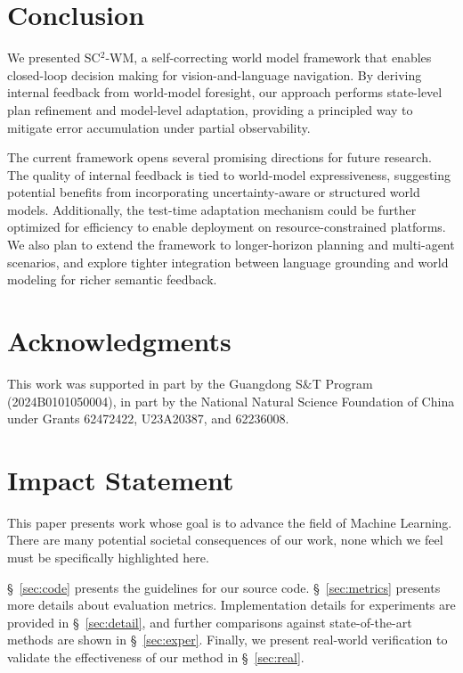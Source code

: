 \documentclass{article}
\theoremstyle{plain}
\theoremstyle{definition}
\theoremstyle{remark}
\begin{document}
\section{Conclusion} \label{sec:conclu} 


We presented SC$^{2}$-WM, a self-correcting world model framework that enables closed-loop decision making for vision-and-language navigation. By deriving internal feedback from world-model foresight, our approach performs state-level plan refinement and model-level adaptation, providing a principled way to mitigate error accumulation under partial observability.

The current framework opens several promising directions for future research. The quality of internal feedback is tied to world-model expressiveness, suggesting potential benefits from incorporating uncertainty-aware or structured world models. Additionally, the test-time adaptation mechanism could be further optimized for efficiency to enable deployment on resource-constrained platforms. We also plan to extend the framework to longer-horizon planning and multi-agent scenarios, and explore tighter integration between language grounding and world modeling for richer semantic feedback.


\section*{Acknowledgments}
This work was supported in part by the Guangdong S$\&$T Program (2024B0101050004), in part by the National Natural Science Foundation of China under Grants 62472422, U23A20387, and 62236008.


\section*{Impact Statement}
This paper presents work whose goal is to advance the field of Machine
Learning. There are many potential societal consequences of our work, none which we feel must be specifically highlighted here.





\newpage
\appendix
\onecolumn

\S~\ref{sec:code} presents the guidelines for our source code. \S~\ref{sec:metrics} presents more details about evaluation metrics. Implementation details for experiments are provided in \S~\ref{sec:detail}, and further comparisons against state-of-the-art methods are shown in \S~\ref{sec:exper}. Finally, we present real-world verification to validate the effectiveness of our method in \S~\ref{sec:real}.
\end{document}
